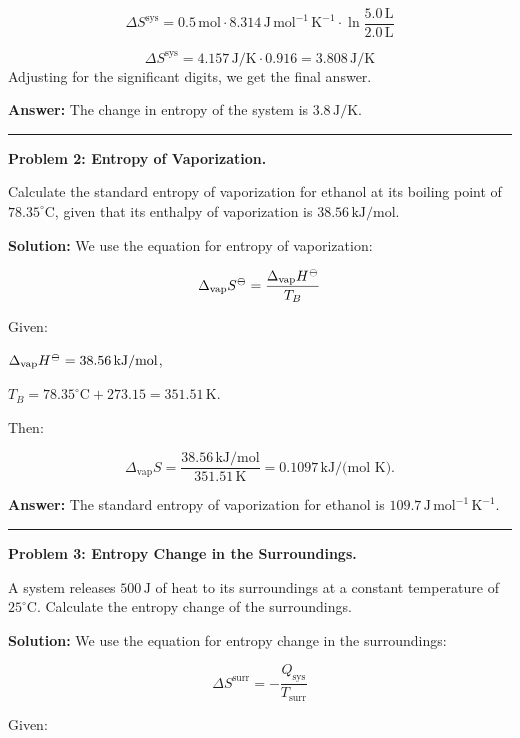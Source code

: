 \documentclass[
  9pt,
]{extbook}
\theoremstyle{definition}
\theoremstyle{definition}
\theoremstyle{definition}
\theoremstyle{definition}
\theoremstyle{remark}
\begin{document}
\[\Delta S^{\text{sys}} = 0.5\,\text{mol} \cdot 8.314\,\text{J} \, \text{mol}^{-1} \, \text{K}^{-1} \cdot \ln \frac{5.0\,\text{L}}{2.0\,\text{L}}\]

\[\Delta S^{\text{sys}} = 4.157\,\text{J/K} \cdot 0.916 = 3.808\,\text{J/K}\]
Adjusting for the significant digits, we get the final answer.

\textbf{Answer:} The change in entropy of the system is \(3.8\,\text{J/K}\).

\begin{center}\rule{0.5\linewidth}{0.5pt}\end{center}

\textbf{Problem 2: Entropy of Vaporization.}

Calculate the standard entropy of vaporization for ethanol at its boiling point of \(78.35^\circ\text{C}\), given that its enthalpy of vaporization is \(38.56\,\text{kJ/mol}\).

\textbf{Solution:} We use the equation for entropy of vaporization:

\[\Delta_{\text{vap}} S^{-\kern-6pt{\ominus}\kern-6pt-}= \frac{\Delta_{\text{vap}} H^{-\kern-6pt{\ominus}\kern-6pt-}}{T_B}\]

Given:

\(\Delta_{\text{vap}} H^{-\kern-6pt{\ominus}\kern-6pt-}= 38.56\,\text{kJ/mol}\),

\(T_B = 78.35^\circ\text{C}+273.15=351.51\,\text{K}\).

Then:

\[\Delta_{\text{vap}} S = \frac{38.56\,\text{kJ/mol}}{351.51\,\text{K}} = 0.1097\,\text{kJ/(mol K)}.\]

\textbf{Answer:} The standard entropy of vaporization for ethanol is \(109.7\,\text{J} \, \text{mol}^{-1} \, \text{K}^{-1}\).

\begin{center}\rule{0.5\linewidth}{0.5pt}\end{center}

\textbf{Problem 3: Entropy Change in the Surroundings.}

A system releases \(500\,\text{J}\) of heat to its surroundings at a constant temperature of \(25^\circ\text{C}\). Calculate the entropy change of the surroundings.

\textbf{Solution:} We use the equation for entropy change in the surroundings:

\[\Delta S^{\text{surr}} = -\frac{Q_{\text{sys}}}{T_{\text{surr}}}\]

Given:
\end{document}
